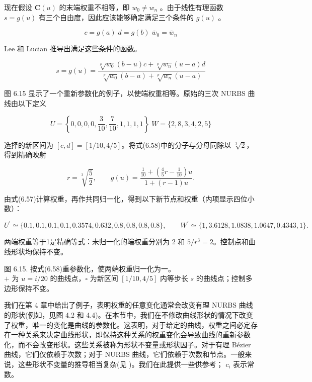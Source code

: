 \documentclass[../main.tex]{subfiles}
\begin{document}
现在假设 \(\mathbf{C}\left( u\right)\) 的末端权重不相等，即 \({w}_{0} \neq  {w}_{n}\) 。由于线性有理函数 \(s = g\left( u\right)\) 有三个自由度，因此应该能够确定满足三个条件的 \(g\left( u\right)\) 。

\[
c = g\left( a\right) \;d = g\left( b\right) \;{\bar{w}}_{0} = {\bar{w}}_{n}
\]

Lee 和 Lucian \cite{Lee91} 推导出满足这些条件的函数。

\[
s = g\left( u\right)  = \frac{\sqrt[p]{{w}_{0}}\left( {b - u}\right) c + \sqrt[p]{{w}_{n}}\left( {u - a}\right) d}{\sqrt[p]{{w}_{0}}\left( {b - u}\right)  + \sqrt[p]{{w}_{n}}\left( {u - a}\right) } \tag{6.58}
\]

图 6.15 显示了一个重新参数化的例子，以使端权重相等。原始的三次 NURBS 曲线由以下定义

\[
U = \left\{  {0,0,0,0,\frac{3}{10},\frac{7}{10},1,1,1,1}\right\}  \;W = \{ 2,8,3,4,2,5\}
\]

选择的新区间为 $[c,d]=[1/10,4/5]$。将式(6.58)中的分子与分母同除以 $\sqrt[3]{2}$，得到精确映射

\[
r=\sqrt[3]{\frac52},\qquad g(u)=\frac{\frac1{10}+\left(\frac45r-\frac1{10}\right)u}{1+(r-1)u}.
\]

由式(6.57)计算权重，再作共同归一化，得到以下新节点和权重（内项显示四位小数）：

\[
U^{\prime}\simeq \{0.1,0.1,0.1,0.1,0.3574,0.632,0.8,0.8,0.8,0.8\},\qquad W^{\prime}\simeq \{1,3.6128,1.0838,1.0647,0.4343,1\}.
\]

两端权重等于1是精确等式：未归一化的端权重分别为 $2$ 和 $5/r^3=2$。控制点和曲线形状均保持不变。

\begin{center}
\begin{minipage}{18cm}
\vspace*{.6\baselineskip}
\centering
{}
\par\smallskip
图 6.15. 按式(6.58)重参数化，使两端权重归一化为一。\\
$+$ 为 $u=i/20$ 的曲线点，$\square$ 为新区间 $[1/10,4/5]$ 内等步长 $s$ 的曲线点；控制多边形保持不变。
\end{minipage}
\end{center}

我们在第 4 章中给出了例子，表明权重的任意变化通常会改变有理 NURBS 曲线的形状(例如，见图 4.2 和 4.4)。在本节中，我们在不修改曲线形状的情况下改变了权重，唯一的变化是曲线的参数化。这表明，对于给定的曲线，权重之间必定存在一种关系来决定曲线形状，即保持这种关系的权重变化会导致曲线的重新参数化，而不会改变形状。这些关系被称为形状不变量或形状因子。对于有理 Bézier 曲线，它们仅依赖于次数；对于 NURBS 曲线，它们依赖于次数和节点。一般来说，这些形状不变量的推导相当复杂(见 \cite{Forr68,Vers75,Patt85,Lee87,Pieg91a})。我们在此提供一些供参考； \({c}_{i}\) 表示常数。
\end{document}
